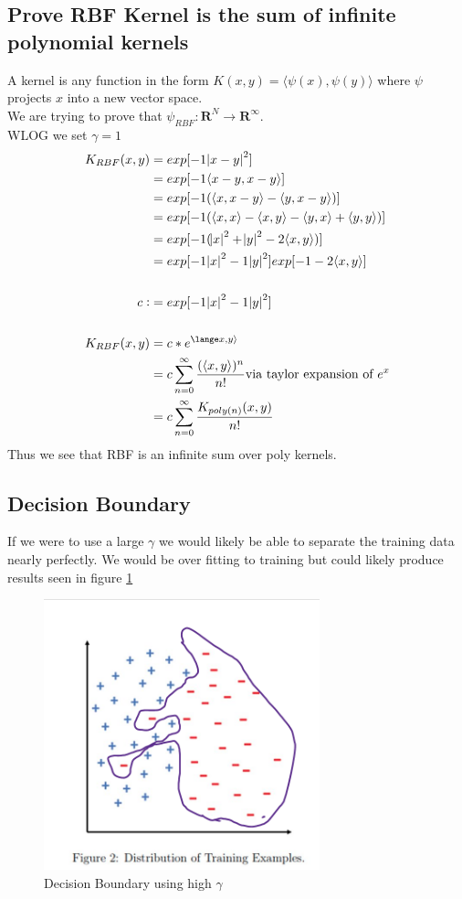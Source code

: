 \documentclass[11pt]{article}
\begin{document}
\subsection{Prove RBF Kernel is the sum of infinite polynomial kernels}
A kernel is any function in the form $K(x, y) = \langle \psi(x), \psi(y)\rangle$ where $\psi$ projects $x$ into a new vector space. \\
We are trying to prove that $\psi_{RBF}: \mathbf{R}^N \rightarrow \mathbf{R}^\infty$. \\
WLOG we set $\gamma = 1$
\begin{equation}
\begin{split}
K_{RBF}(x, y)  &= exp [-1 \abs{x -y}^2] \\
& = exp [-1 \langle x -y, x-y \rangle] \\
& = exp [-1 (\langle x, x -y \rangle - \langle y, x-y \rangle)] \\
& = exp [-1 (\langle x, x \rangle - \langle x,y \rangle -\langle y, x \rangle + \langle y,y \rangle)] \\
& = exp [-1 (\abs{x}^2 + \abs{y}^2 - 2 \langle x, y \rangle)] \\
& = exp[-1\abs{x}^2-1\abs{y}^2 ]exp[-1 -2 \langle x, y \rangle] \\ \\
c :&= exp[-1\abs{x}^2-1\abs{y}^2 ] \\ \\
K_{RBF}(x, y) &= c*e^{\lange x, y \rangle} \\
&= c \sum_{n=0}^{\infty} \frac{(\langle x, y \rangle)^n}{n!}  \text{via taylor expansion of $e^x$}  \\ 
&= c \sum_{n=0}^{\infty} \frac{K_{poly(n)}(x,y)}{n!}
\end{split}
\end{equation}
Thus we see that RBF is an infinite sum over poly kernels.
\subsection{Decision Boundary}
If we were to use a large $\gamma$ we would likely be able to separate the training data nearly perfectly. We would be over fitting to training but could likely produce results seen in figure \ref{fig:bound}
\begin{figure}[]
\centering
\includegraphics[width=8cm]{Assignments/Assignment1/decisionbound.png}
\caption{Decision Boundary using high $\gamma$}
\label{fig:bound}
\end{figure}
\end{document}
